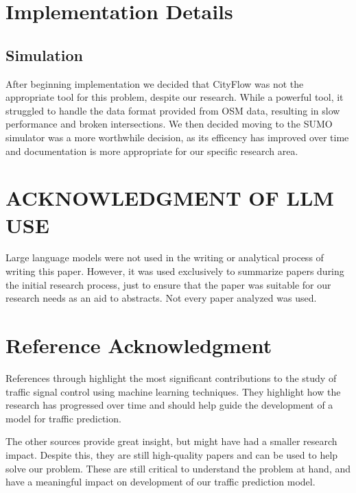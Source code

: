 \documentclass[conference]{IEEEtran}
\begin{document}
\section{Implementation Details}

\subsection{Simulation}

After beginning implementation we decided that CityFlow was not the appropriate tool for this problem, despite our research. While a powerful tool, it struggled to handle the data format provided from OSM data, resulting in slow performance and broken intersections. We then decided moving to the SUMO simulator was a more worthwhile decision, as its efficency has improved over time and documentation is more appropriate for our specific research area. 



\section{ACKNOWLEDGMENT OF LLM USE}

Large language models were not used in the writing or analytical process of writing this paper. However, it was used exclusively to summarize papers during the initial research process, just to ensure that the paper was suitable for our research needs as an aid to abstracts. Not every paper analyzed was used. 

\section*{Reference Acknowledgment}
References \cite{1} through \cite{15} highlight the most significant contributions to the study of traffic signal control using machine learning techniques. They highlight how the research has progressed over time and should help guide the development of a model for traffic prediction. 

The other sources provide great insight, but might have had a smaller research impact. Despite this, they are still high-quality papers and can be used to help solve our problem. These are still critical to understand the problem at hand, and have a meaningful impact on development of our traffic prediction model. 
\end{document}

